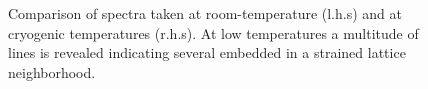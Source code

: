 \begin{figure}[!htb]
\begin{subfigure}[t]{ 0.49\linewidth}
					\centering
					\caption{}
					\label{subfig::roomtep2}
				\end{subfigure}
				\hfill
				\begin{subfigure}[t]{ 0.49\linewidth}
					\centering
					\caption{}
					\label{subfig::cryo2}
				\end{subfigure}
				\caption[Spectra of \nds at cryogenic temperatures]{Comparison of spectra taken at room-temperature (l.h.s) and at cryogenic temperatures (r.h.s). At low temperatures a multitude of lines is revealed indicating several \sivs embedded in a strained lattice neighborhood.}
				\label{fig::rt_vs_cryo}
			\end{figure}

